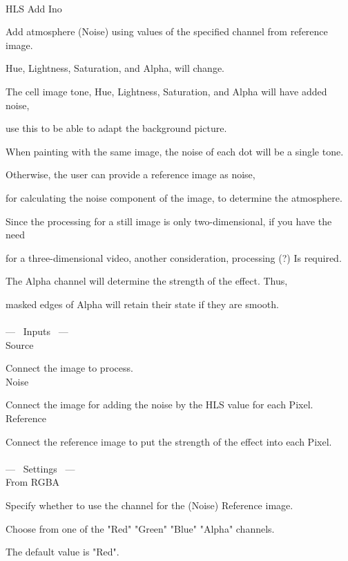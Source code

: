 \documentclass[a4paper,12pt]{article}
\begin{document}
\thispagestyle{empty}

\Large
\noindent \\
HLS Add Ino\medskip
\par
\normalsize
Add atmosphere (Noise) using values of the specified channel from reference image.\par
Hue, Lightness, Saturation, and Alpha, will change.\\
\par
The cell image tone, Hue, Lightness, Saturation, and Alpha will have added noise,\par
use this to be able to adapt the background picture.\par
When painting with the same image, the noise of each dot will be a single tone.\par
Otherwise, the user can provide a reference image as noise,\par
for calculating the noise component of the image, to determine the atmosphere.
\\
\par
Since the processing for a still image is only two-dimensional, if you have the need\par
for a three-dimensional video, another consideration, processing (?) Is required.\\
\par
The Alpha channel will determine the strength of the effect. Thus,\par
masked edges of Alpha will retain their state if they are smooth.\\
\\
--- \ Inputs \ ---\\
Source\par
Connect the image to process.\\
Noise\par
Connect the image for adding the noise by the HLS value for each Pixel.\\
Reference\par
Connect the reference image to put the strength of the effect into each Pixel.\\
\\
--- \ Settings \ ---\\
From RGBA\par
Specify whether to use the channel for the (Noise) Reference image.\par
Choose from one of the "Red" "Green" "Blue" "Alpha" channels.\par
The default value is "Red".\\
\end{document}
